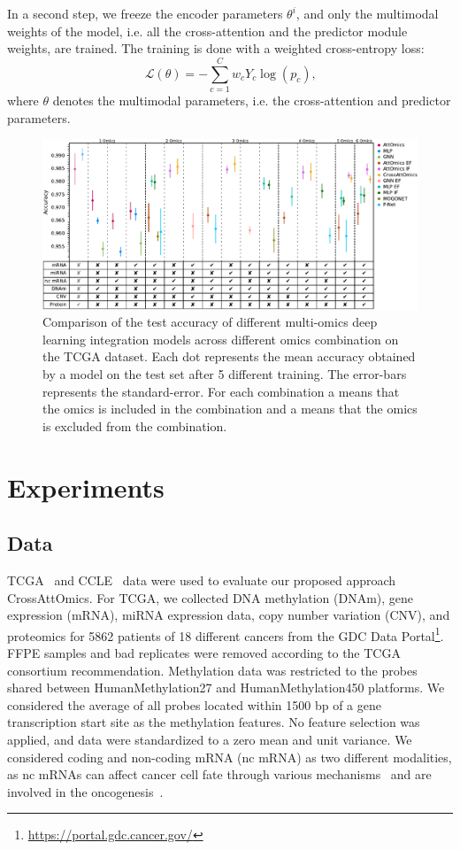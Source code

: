\documentclass[../main.tex]{subfiles}
\begin{document}
     In a second step, we freeze the encoder parameters \(\theta^i\), and only the multimodal weights of the model, i.e. all the cross-attention and the predictor module weights, are trained.
     The training is done with a weighted cross-entropy loss:
     \begin{equation*}
         \mathcal{L}(\theta) = - \sum_{c=1}^{C}w_c Y_c \log\left( p_c\right) \text{,}
     \end{equation*}
     where $\theta$ denotes the multimodal parameters, i.e. the cross-attention and predictor parameters.
     \begin{figure}[htbp]
         \centering
         \includegraphics[width=1\textwidth]{tcga_perf_omics_comb.pdf}
         \caption{Comparison of the test accuracy of different multi-omics deep learning integration models across different omics combination on the TCGA dataset. Each dot represents the mean accuracy obtained by a model on the test set after 5 different training. The error-bars represents the standard-error. For each combination a \cmark means that the omics is included in the combination and a \xmark means that the omics is excluded from the combination.}
         \label{fig:tcga_perf_comb}
     \end{figure}

\section{Experiments}
 \subsection{Data}
     TCGA~\cite{TCGA} and CCLE~\cite{CCLE} data were used to evaluate our proposed approach CrossAttOmics.
     For TCGA, we collected DNA methylation (DNAm), gene expression (mRNA), miRNA expression data, copy number variation (CNV), and proteomics for 5862 patients of 18 different cancers from the GDC Data Portal\footnote{\url{https://portal.gdc.cancer.gov/}}.
     FFPE samples and bad replicates were removed according to the TCGA consortium recommendation.
     Methylation data was restricted to the probes shared between HumanMethylation27 and HumanMethylation450 platforms.
     We considered the average of all probes located within 1500 bp of a gene transcription start site as the methylation features.
     No feature selection was applied, and data were standardized to a zero mean and unit variance.
     We considered coding and non-coding mRNA (nc mRNA) as two different modalities, as nc mRNAs can affect cancer cell fate through various mechanisms~\cite{Grillone2020} and are involved in the oncogenesis~\cite{Toden2021}.
\end{document}
